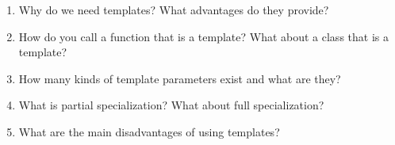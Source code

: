 \begin{enumerate}
\item
Why do we need templates? What advantages do they provide?

\item
How do you call a function that is a template? What about a class that is a template?

\item
How many kinds of template parameters exist and what are they?

\item
What is partial specialization? What about full specialization?

\item
What are the main disadvantages of using templates?
\end{enumerate}